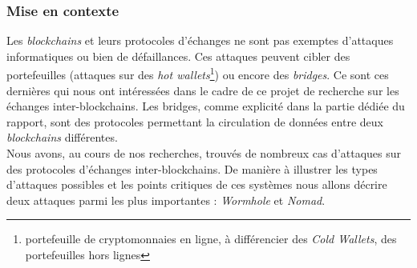 \subsubsection{Mise en contexte}
Les \textit{blockchains} et leurs protocoles d'échanges ne sont pas exemptes d'attaques informatiques ou bien de défaillances.
Ces attaques peuvent cibler des portefeuilles (attaques sur des \textit{hot wallets}\footnote{portefeuille de cryptomonnaies en ligne, à différencier des \textit{Cold Wallets}, des portefeuilles hors lignes}) ou encore des \textit{bridges}. 
Ce sont ces dernières qui nous ont intéressées dans le cadre de ce projet de recherche sur les échanges inter-blockchains. 
Les bridges, comme explicité dans la partie dédiée du rapport, sont des protocoles permettant la circulation de données entre deux \textit{blockchains} différentes.\\
Nous avons, au cours de nos recherches, trouvés de nombreux cas d'attaques sur des protocoles d'échanges inter-blockchains. 
De manière à illustrer les types d'attaques possibles et les points critiques de ces systèmes nous allons décrire deux attaques parmi les plus importantes : \textit{Wormhole} et \textit{Nomad}.

